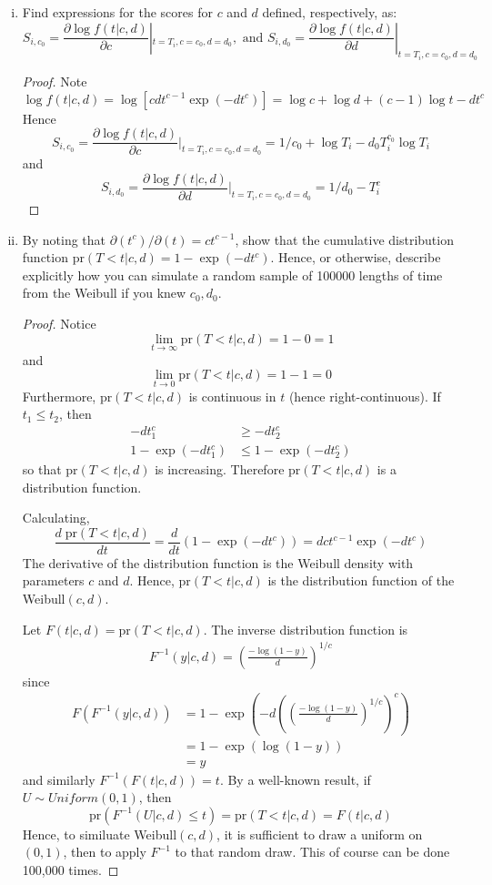 \documentclass[letterpaper, 12pt]{article}
\newcommand{\pr}{\text{pr}}
\begin{document}
\begin{enumerate}[(i)]
\item
Find expressions for the scores for $c$ and $d$ defined, respectively, as:
\[
S_{i, c_0} = 
\frac{\partial \log f(t|c,d)}{\partial c}
|
_{t=T_i, c=c_0, d=d_0},
\text{ and }
S_{i, d_0} =
\frac{\partial \log f(t|c,d)}{\partial d}
|
_{t=T_i, c=c_0, d=d_0}
\]

\begin{proof}
Note
\[
\log f(t|c,d) = \log [cdt^{c-1}\exp(-dt^c)]
= \log c + \log d + (c-1) \log t - dt^c
\]
Hence
\[
S_{i, c_0} = 
\frac{\partial \log f(t|c,d)}{\partial c}
|
_{t=T_i, c=c_0, d=d_0}
=
1/c_0 + \log T_i - d_0 T_i^{c_0} \log T_i
\]
and
\[
S_{i, d_0} = 
\frac{\partial \log f(t|c,d)}{\partial d}
|
_{t=T_i, c=c_0, d=d_0}
=
1/d_0 - T_i^c
\]
\end{proof}

\item
By noting that
$\partial(t^c) / \partial(t) = ct^{c-1}$, show that the cumulative distribution function $\pr(T<t | c,d) = 1 - \exp(-dt^c)$. Hence, or otherwise, describe explicitly how you can simulate a random sample of 100000 lengths of time from the Weibull if you knew $c_0, d_0$.
\begin{proof}
Notice
\[
\lim_{t \to \infty}
\pr(T<t | c,d)
=
1 - 0 = 1
\]
and 
\[
\lim_{t \to 0}
\pr(T<t | c,d)
=
1- 1
=
0
\]
Furthermore, $\pr(T<t | c,d)$ is continuous in $t$ (hence right-continuous). If $t_1 \leq t_2$, then
\begin{align*}
-dt_1^c &\geq -dt_2^c \\
1-\exp(-dt_1^c) &\leq 1 -\exp(-dt_2^c)
\end{align*}
so that $\pr(T<t | c,d)$ is increasing. Therefore $\pr(T<t | c,d)$ is a distribution function.

Calculating,
\[
\frac{d \; \pr(T<t | c,d)}{dt}
=
\frac{d}{dt}
(1 - \exp(-dt^c))
=
dct^{c-1} \exp(-dt^c)
\]
The derivative of the distribution function is the Weibull density with parameters $c$ and $d$. Hence, $\pr(T<t | c,d)$ is the distribution function of the Weibull$(c,d)$. 

Let $F(t|c,d) = \pr(T<t | c,d)$. The inverse distribution function is 
\begin{align*}
F^{-1}(y|c,d) = \left(\frac{-\log (1-y)}{d} \right)^{1/c}
\end{align*}
since
\begin{align*}
F(F^{-1}(y|c,d)) 
&= 1 - \exp
\left(
-d 
\left(
\left(\frac{-\log (1-y)}{d} \right)^{1/c}
\right) ^c
\right)
\\
&=
1 - \exp(\log(1-y))
\\
&=
y
\end{align*}
and similarly $F^{-1}(F(t|c,d)) = t$. By a well-known result, if $U \sim Uniform(0,1)$, then 
\[
\pr(F^{-1}(U|c,d) \leq t) = \pr(T < t |c,d)  = F(t|c,d) 
\]
Hence, to similuate Weibull$(c,d)$, it is sufficient to draw a uniform on $(0,1)$, then to apply $F^{-1}$ to that random draw. This of course can be done 100,000 times.
\end{proof}


\end{enumerate}
\end{document}
